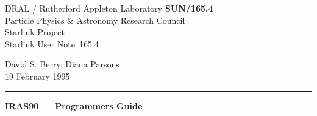 
\pagestyle{myheadings}

\newcommand{\stardoccategory}  {Starlink User Note}
\newcommand{\stardocinitials}  {SUN}
\newcommand{\stardocnumber}    {165.4}
\newcommand{\stardocauthors}   {David S. Berry, Diana Parsons}
\newcommand{\stardocdate}      {19 February 1995}
\newcommand{\stardoctitle}     {IRAS90 --- Programmers Guide}

\newcommand{\stardocname}{\stardocinitials /\stardocnumber}
\renewcommand{\_}{{\tt\char'137}}     %
\markright{\stardocname}
\setlength{\textwidth}{160mm}
\setlength{\textheight}{230mm}
\setlength{\topmargin}{-2mm}
\setlength{\oddsidemargin}{0mm}
\setlength{\evensidemargin}{0mm}
\setlength{\parindent}{0mm}
\setlength{\parskip}{\medskipamount}
\setlength{\unitlength}{1mm}
\setlength{\unitlength}{1mm}


\newcommand{\dgs}{\hbox{$^\circ$}} 
\newcommand{\lsk}{\raisebox{-0.4ex}{\rm *}}
\newcommand{\menuitem}[2]
  {{\bf #1}: \addtolength{\baselineskip}{-0.4ex}
  \parbox[t]{128mm}{#2} \addtolength{\baselineskip}{0.4ex} \\ \hspace{-5pt}}
\newenvironment{refs}{\goodbreak
                      \vspace{3ex}
                      \begin{list}{}{\setlength{\topsep}{0mm}
                                     \setlength{\partopsep}{0mm}
                                     \setlength{\itemsep}{0mm}
                                     \setlength{\parsep}{0mm}
                                     \setlength{\leftmargin}{1.5em}
                                     \setlength{\itemindent}{-\leftmargin}
                                     \setlength{\labelsep}{0mm}
                                     \setlength{\labelwidth}{0mm}}
                    }{\end{list}}


\thispagestyle{empty}
DRAL / {\sc Rutherford Appleton Laboratory} \hfill {\bf \stardocname}\\
{\large Particle Physics \& Astronomy Research Council}\\
{\large Starlink Project\\}
{\large \stardoccategory\ \stardocnumber}
\begin{flushright}
\stardocauthors\\
\stardocdate
\end{flushright}
\vspace{-4mm}
\rule{\textwidth}{0.5mm}
\vspace{5mm}
\begin{center}
{\Large\bf \stardoctitle}
\end{center}
\vspace{5mm}

